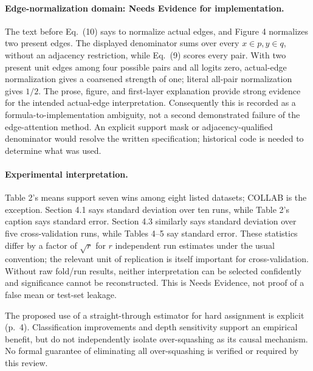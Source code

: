 \documentclass[10pt]{article}
\begin{document}
\paragraph*{Edge-normalization domain: Needs Evidence for implementation.}\mbox{}\par
The text before Eq. (10) says to normalize actual edges, and Figure 4 normalizes two present edges. The displayed denominator sums over every \(x\in p,y\in q\), without an adjacency restriction, while Eq. (9) scores every pair. With two present unit edges among four possible pairs and all logits zero, actual-edge normalization gives a coarsened strength of one; literal all-pair normalization gives \(1/2\). The prose, figure, and first-layer explanation provide strong evidence for the intended actual-edge interpretation. Consequently this is recorded as a formula-to-implementation ambiguity, not a second demonstrated failure of the edge-attention method. An explicit support mask or adjacency-qualified denominator would resolve the written specification; historical code is needed to determine what was used.\par
\paragraph*{Experimental interpretation.}\mbox{}\par
Table 2’s means support seven wins among eight listed datasets; COLLAB is the exception. Section 4.1 says standard deviation over ten runs, while Table 2’s caption says standard error. Section 4.3 similarly says standard deviation over five cross-validation runs, while Tables 4–5 say standard error. These statistics differ by a factor of \(\sqrt r\) for \(r\) independent run estimates under the usual convention; the relevant unit of replication is itself important for cross-validation. Without raw fold/run results, neither interpretation can be selected confidently and significance cannot be reconstructed. This is Needs Evidence, not proof of a false mean or test-set leakage.\par
The proposed use of a straight-through estimator for hard assignment is explicit (p. 4). Classification improvements and depth sensitivity support an empirical benefit, but do not independently isolate over-squashing as its causal mechanism. No formal guarantee of eliminating all over-squashing is verified or required by this review.\par
\end{document}
